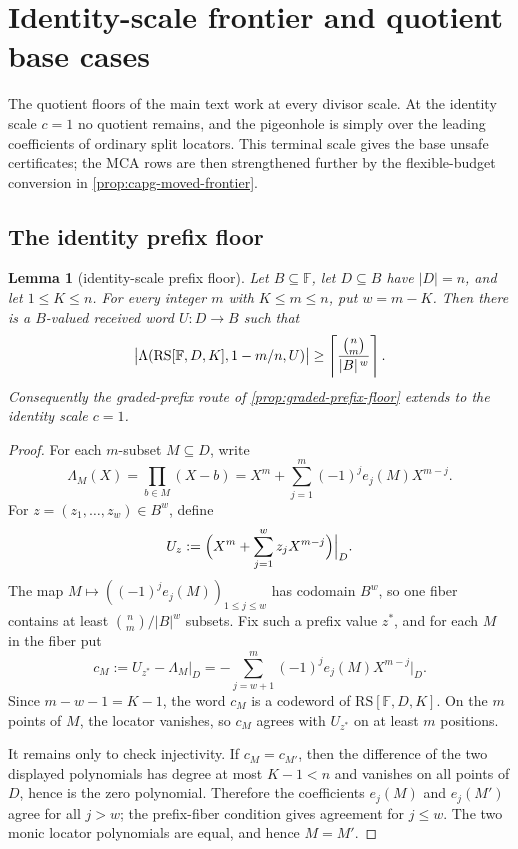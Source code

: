 \documentclass[11pt]{article}
\newtheorem{lemma}[lemma]{Lemma}
\theoremstyle{definition}
\theoremstyle{remark}
\newcommand{\F}{\mathbb{F}}
\newcommand{\B}{B}
\newcommand{\RS}{\mathrm{RS}}
\newcommand{\Lst}{\Lambda}
\begin{document}
\section{Identity-scale frontier and quotient base cases}\label{sec:capff1-frontier}

The quotient floors of the main text work at every divisor scale.  At the identity scale $c=1$ no quotient remains, and the pigeonhole is simply over the leading coefficients of ordinary split locators.  This terminal scale gives the base unsafe certificates; the MCA rows are then strengthened further by the flexible-budget conversion in \cref{prop:capg-moved-frontier}.

\subsection{The identity prefix floor}

\begin{lemma}[identity-scale prefix floor]\label{lem:capff1-identity-prefix-floor}
Let $\B\subseteq\F$, let $D\subseteq\B$ have $|D|=n$, and let $1\le K\le n$.  For every integer $m$ with $K\le m\le n$, put $w=m-K$.  Then there is a $\B$-valued received word $U:D\to\B$ such that
\[
        \bigl|\Lst(\RS[\F,D,K],1-m/n,U)\bigr|
        \ge
        \left\lceil {\binom n m\over |\B|^{\,w}}\right\rceil .
\]
Consequently the graded-prefix route of \cref{prop:graded-prefix-floor} extends to the identity scale $c=1$.
\end{lemma}

\begin{proof}
For each $m$-subset $M\subseteq D$, write
\[
        \Lambda_M(X)=\prod_{b\in M}(X-b)
        =X^m+\sum_{j=1}^{m}(-1)^j e_j(M)X^{m-j}.
\]
For $z=(z_1,\ldots,z_w)\in\B^w$, define
\[
        U_z:=\Bigl(X^m+\sum_{j=1}^{w}z_jX^{m-j}\Bigr)\Big|_D.
\]
The map $M\mapsto((-1)^je_j(M))_{1\le j\le w}$ has codomain $\B^w$, so one fiber contains at least $\binom nm/|\B|^w$ subsets.  Fix such a prefix value $z^*$, and for each $M$ in the fiber put
\[
        c_M:=U_{z^*}-\Lambda_M|_D
        =-\sum_{j=w+1}^{m}(-1)^je_j(M)X^{m-j}\Big|_D.
\]
Since $m-w-1=K-1$, the word $c_M$ is a codeword of $\RS[\F,D,K]$.  On the $m$ points of $M$, the locator vanishes, so $c_M$ agrees with $U_{z^*}$ on at least $m$ positions.

It remains only to check injectivity.  If $c_M=c_{M'}$, then the difference of the two displayed polynomials has degree at most $K-1<n$ and vanishes on all points of $D$, hence is the zero polynomial.  Therefore the coefficients $e_j(M)$ and $e_j(M')$ agree for all $j>w$; the prefix-fiber condition gives agreement for $j\le w$.  The two monic locator polynomials are equal, and hence $M=M'$.
\end{proof}
\end{document}
